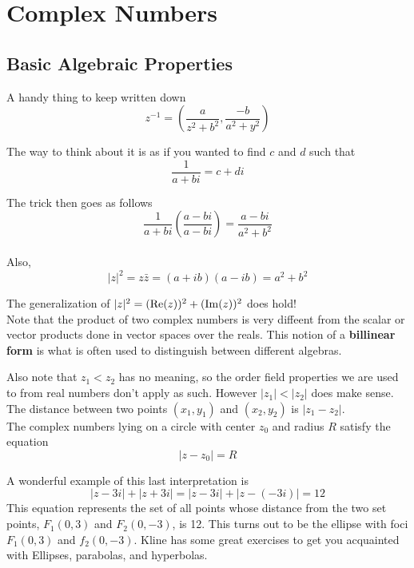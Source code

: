 \section{Complex Numbers}

\subsection{Basic Algebraic Properties}

A handy thing to keep written down
$$
z^{-1} = \left(\frac{a}{z^2 + b^2}, \frac{-b}{a^2 + y^2}\right)
$$

The way to think about it is as if you wanted to find $c$ and $d$ such that
$$
\frac{1}{a + bi} = c + di
$$

The trick then goes as follows
$$
\frac{1}{a + bi} \left( \frac{a - bi}{a - bi} \right)= \frac{a - bi}{a^2 + b^2}
$$
\\



Also,
$$
|z|^2 = z\bar{z} = (a + ib)(a - ib) = a^2 + b^2
$$

The generalization of $|z|^2 = (\operatorname{Re}(z))^2 + (\operatorname{Im}(z))^2$ does hold!
\\


Note that the product of two complex numbers is very diffeent from the scalar or vector products
done in vector spaces over the reals.
This notion of a \textbf{billinear form} is what is often used to distinguish between different
algebras.

Also note that $z_1 < z_2$ has no meaning, so the order field properties we are used to from
real numbers don't apply as such.
However $|z_1| < |z_2|$ does make sense.
\\

The distance between two points $(x_1, y_1)$ and $(x_2, y_2)$ is $|z_1 - z_2|$.
\\

The complex numbers lying on a circle with center $z_0$ and radius $R$ satisfy the equation
$$
|z - z_0| = R
$$

A wonderful example of this last interpretation is
$$
|z - 3i| + |z + 3i| = |z - 3i| + |z - (-3i)| = 12
$$
This equation represents the set of all points whose distance from the two set points, $F_1(0,3)$
and $F_2(0,-3)$, is 12.
This turns out to be the ellipse with foci $F_1(0,3)$ and $f_2(0,-3)$.
Kline has some great exercises to get you acquainted with Ellipses, parabolas, and hyperbolas.


